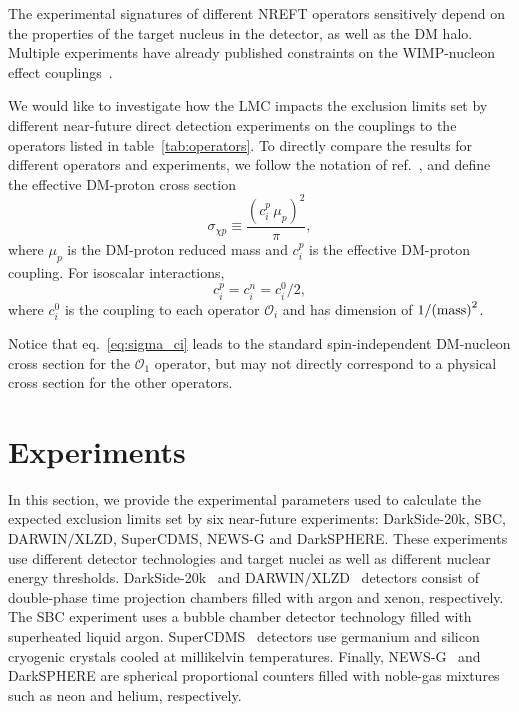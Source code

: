 \documentclass[a4paper,11pt]{article}
\begin{document}
The experimental signatures of different NREFT operators sensitively depend on the properties of the target nucleus in the detector, as well as the DM halo. Multiple experiments have already published constraints on the WIMP-nucleon effect couplings~\cite{DarkSide-50:2020swd,LUX:2021ksq,SuperCDMS:2022crd,SuperCDMS:2015lcz,DEAP:2020iwi, LZ:2023lvz}. 


We would like to investigate how the LMC impacts the  exclusion limits set by different near-future direct detection experiments on the couplings to the  operators listed in table~\ref{tab:operators}. To directly compare the results for different operators and experiments, we follow the notation of ref.~\cite{DEAP:2020iwi}, and define the effective DM-proton cross section
\begin{equation}
\sigma_{\chi p} \equiv \frac{\left( c_{i}^{p}\, \mu_p \right)^{2}}{\pi},
\label{eq:sigma_ci}
\end{equation}
where $\mu_p$ is the DM-proton reduced mass and $c_i^p$ is the effective DM-proton coupling. For isoscalar interactions, 
\begin{equation}
c_{i}^{p} = c_{i}^{n}= c_i^0/2,
\end{equation}
where $c_i^0$ is the coupling to each operator $\mathcal{O}_i$ and has dimension of $1/{\rm (mass)}^2$.

Notice that eq.~\eqref{eq:sigma_ci} leads to the standard spin-independent DM-nucleon cross section for  the $\mathcal{O}_1$ operator, but may not  directly correspond to a physical cross section for the other operators.




\section{Experiments}
\label{sec:experiments}

In this section, we provide the experimental parameters used to calculate the expected exclusion limits set by six near-future experiments: DarkSide-20k, SBC, DARWIN$\slash$XLZD, SuperCDMS, NEWS-G and DarkSPHERE. These experiments use different detector technologies and target nuclei as well as different nuclear energy thresholds. DarkSide-20k~\cite{DarkSide-20k:2017zyg} and DARWIN$\slash$XLZD~\cite{DARWIN:2016hyl, Aalbers:2022dzr, Baudis:2024jnk} detectors consist of double-phase time projection chambers filled with argon and xenon, respectively. The SBC experiment \cite{Alfonso-Pita:2023frp} uses a bubble chamber detector technology filled with superheated liquid argon. SuperCDMS~\cite{SuperCDMS:2016wui} detectors use germanium and silicon cryogenic crystals cooled at millikelvin temperatures. Finally, NEWS-G~\cite{NEWS-G:2022kon} and DarkSPHERE are spherical proportional counters filled with noble-gas mixtures such as neon and helium, respectively. 
\end{document}

